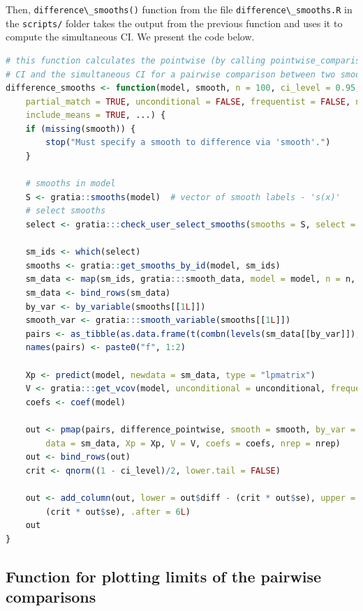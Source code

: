 \documentclass[
]{article}
\newcommand{\passthrough}[1]{#1}
\begin{document}
Then, \passthrough{\lstinline!difference\_smooths()!} function from the file \passthrough{\lstinline!difference\_smooths.R!} in the \passthrough{\lstinline!scripts/!} folder takes the output from the previous function and uses it to compute the simultaneous CI.
We present the code below.

\begin{lstlisting}[language=R]
# this function calculates the pointwise (by calling pointwise_comparisons.R)
# CI and the simultaneous CI for a pairwise comparison between two smooths
difference_smooths <- function(model, smooth, n = 100, ci_level = 0.95, newdata = NULL,
    partial_match = TRUE, unconditional = FALSE, frequentist = FALSE, nrep = 10000,
    include_means = TRUE, ...) {
    if (missing(smooth)) {
        stop("Must specify a smooth to difference via 'smooth'.")
    }

    # smooths in model
    S <- gratia::smooths(model)  # vector of smooth labels - 's(x)'
    # select smooths
    select <- gratia:::check_user_select_smooths(smooths = S, select = smooth, partial_match = partial_match)

    sm_ids <- which(select)
    smooths <- gratia::get_smooths_by_id(model, sm_ids)
    sm_data <- map(sm_ids, gratia:::smooth_data, model = model, n = n, include_all = TRUE)
    sm_data <- bind_rows(sm_data)
    by_var <- by_variable(smooths[[1L]])
    smooth_var <- gratia:::smooth_variable(smooths[[1L]])
    pairs <- as_tibble(as.data.frame(t(combn(levels(sm_data[[by_var]]), 2)), stringsAsFactor = FALSE))
    names(pairs) <- paste0("f", 1:2)

    Xp <- predict(model, newdata = sm_data, type = "lpmatrix")
    V <- gratia:::get_vcov(model, unconditional = unconditional, frequentist = frequentist)
    coefs <- coef(model)

    out <- pmap(pairs, difference_pointwise, smooth = smooth, by_var = by_var, smooth_var = smooth_var,
        data = sm_data, Xp = Xp, V = V, coefs = coefs, nrep = nrep)
    out <- bind_rows(out)
    crit <- qnorm((1 - ci_level)/2, lower.tail = FALSE)

    out <- add_column(out, lower = out$diff - (crit * out$se), upper = out$diff +
        (crit * out$se), .after = 6L)
    out
}
\end{lstlisting}

\hypertarget{function-for-plotting-limits-of-the-pairwise-comparisons}{%
\subsection{Function for plotting limits of the pairwise comparisons}\label{function-for-plotting-limits-of-the-pairwise-comparisons}}
\end{document}
